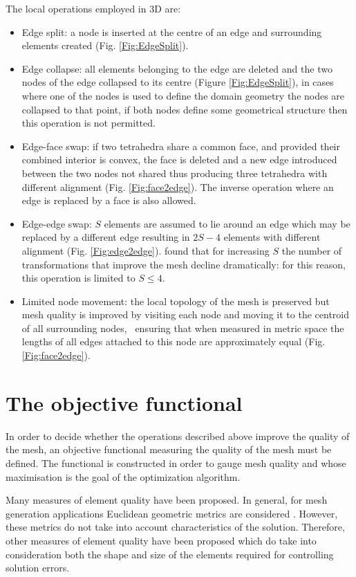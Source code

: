 The local operations employed in 3D are:
\begin{itemize}
\item{Edge split:} a node is inserted at the centre of an edge and
  surrounding elements created (Fig. \ref{Fig:EdgeSplit}).
\item{Edge collapse:} all elements belonging to the edge are deleted
  and the two nodes of the edge collapsed to its centre (Figure
  \ref{Fig:EdgeSplit}), in cases where one of the nodes is used to
  define the domain geometry the nodes are collapsed to that point, if
  both nodes define some geometrical structure then this operation is
  not permitted.
\item{Edge-face swap:} if two tetrahedra share a common face, and
  provided their combined interior is convex, the face is deleted and
  a new edge introduced between the two nodes not shared thus
  producing three tetrahedra with different alignment
  (Fig. \ref{Fig:face2edge}). The inverse operation where an edge is
  replaced by a face is also allowed.
\item{Edge-edge swap:} $S$ elements are assumed to lie around an edge
  which may be replaced by a different edge resulting in $2S-4$
  elements with different alignment (Fig. \ref{Fig:edge2edge}).
  \cite{freitag1997} found that for increasing $S$ the number of
  transformations that improve the mesh decline dramatically: for this
  reason, this operation is limited to $S\le 4$.
\item{Limited node movement:} the local topology of the mesh is
  preserved but mesh quality is improved by visiting each node and
  moving it to the centroid of all surrounding nodes, \ie\  ensuring
  that when measured in metric space the lengths of all edges attached
  to this node are approximately equal (Fig. \ref{Fig:face2edge}).
\end{itemize}

\section{The objective functional}
In order to decide whether the operations described above improve the
quality of the mesh, an objective functional measuring the quality of
the mesh must be defined.  The functional is constructed in order to
gauge mesh quality and whose maximisation is the goal of the
optimization algorithm.

Many measures of element quality have been proposed. In general, for
mesh generation applications Euclidean geometric metrics are
considered \cite{knupp2000achievingI,
  knupp2000achievingII}. However, these metrics do not take into
account characteristics of the solution. Therefore, other measures of
element quality have been proposed which do take into consideration both
the shape and size of the elements required for controlling solution
errors.

